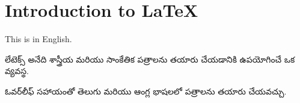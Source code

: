 \documentclass[12pt,a4paper]{article}
\begin{document}
\section*{Introduction to LaTeX}

This is in English.

{\telugufont

లేటెక్స్ అనేది శాస్త్రీయ మరియు
సాంకేతిక పత్రాలను తయారు చేయడానికి
ఉపయోగించే ఒక వ్యవస్థ.

ఓవర్‌లీఫ్ సహాయంతో తెలుగు మరియు
ఆంగ్ల భాషలలో పత్రాలను తయారు చేయవచ్చు.
}
\end{document}
